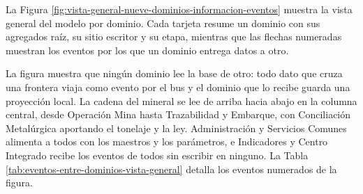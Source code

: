 \documentclass[subdoc]{../../comun/overfore}
\begin{document}
La Figura \ref{fig:vista-general-nueve-dominios-informacion-eventos} muestra la vista general del modelo por dominio. Cada tarjeta resume un dominio con sus agregados raíz, su sitio escritor y su etapa, mientras que las flechas numeradas muestran los eventos por los que un dominio entrega datos a otro.

\begin{horizontal}
\end{horizontal}
La figura muestra que ningún dominio lee la base de otro: todo dato que cruza una frontera viaja como evento por el bus y el dominio que lo recibe guarda una proyección local. La cadena del mineral se lee de arriba hacia abajo en la columna central, desde Operación Mina hasta Trazabilidad y Embarque, con Conciliación Metalúrgica aportando el tonelaje y la ley. Administración y Servicios Comunes alimenta a todos con los maestros y los parámetros, e Indicadores y Centro Integrado recibe los eventos de todos sin escribir en ninguno. La Tabla \ref{tab:eventos-entre-dominios-vista-general} detalla los eventos numerados de la figura.
\end{document}
